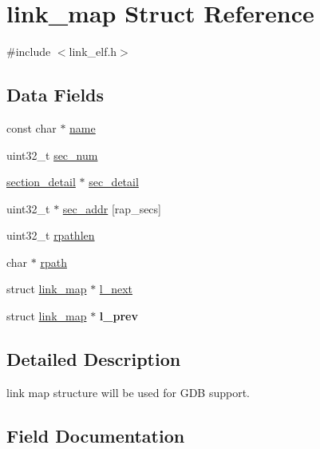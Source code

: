 \hypertarget{structlink__map}{}\section{link\+\_\+map Struct Reference}
\label{structlink__map}


{\ttfamily \#include $<$link\+\_\+elf.\+h$>$}

\subsection*{Data Fields}
\begin{DoxyCompactItemize}
\item 
const char $\ast$ \mbox{\hyperlink{structlink__map_ac2e603e83cf4ca7e1b8a12c0c5e05b16}{name}}
\item 
uint32\+\_\+t \mbox{\hyperlink{structlink__map_a28ec89a893caaca6ddac22ab09f33cf3}{sec\+\_\+num}}
\item 
\mbox{\hyperlink{structsection__detail}{section\+\_\+detail}} $\ast$ \mbox{\hyperlink{structlink__map_abd7988ed729960f7aa4336fb4eb32f64}{sec\+\_\+detail}}
\item 
uint32\+\_\+t $\ast$ \mbox{\hyperlink{structlink__map_ab5a1b77b9948416f1366596cf7096244}{sec\+\_\+addr}} \mbox{[}rap\+\_\+secs\mbox{]}
\item 
uint32\+\_\+t \mbox{\hyperlink{structlink__map_a99e44b8c98d13eae0ec8e65d0a80917b}{rpathlen}}
\item 
char $\ast$ \mbox{\hyperlink{structlink__map_a8c143a0fe25c2b89bc00cfb25aa29009}{rpath}}
\item 
struct \mbox{\hyperlink{structlink__map}{link\+\_\+map}} $\ast$ \mbox{\hyperlink{structlink__map_aaabfca11d1665de9ed16e8e2917c8c0c}{l\+\_\+next}}
\item 
\mbox{\label{structlink__map_a5e93735ecf504a454fd66017c9c1c1b4}} 
struct \mbox{\hyperlink{structlink__map}{link\+\_\+map}} $\ast$ {\bfseries l\+\_\+prev}
\end{DoxyCompactItemize}


\subsection{Detailed Description}
link map structure will be used for G\+DB support. 

\subsection{Field Documentation}
\mbox{\label{structlink__map_aaabfca11d1665de9ed16e8e2917c8c0c}} 
